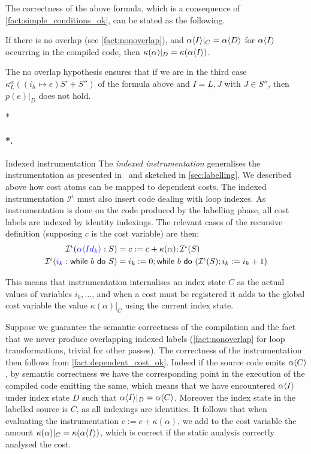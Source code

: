 \documentclass[submission,copyright,creativecommons]{eptcs}
\makeatletter
\theoremstyle{definition}
\newcommand{\s}[1]{{\sf #1}}    \newcommand{\vc}[1]{{\bf #1}}
\newcommand{\sop}[1]{\s{#1}\ }
\newcommand{\sbin}[1]{\ \s{#1}\ }
\newcommand{\ass}{\mathrel{:=}}
\def\lbl#1:{\mbox{\color{blue}$#1$}:}
\let\oldparagraph\paragraph
\def\paragraph{\@ifnextchar*\new@paragraph@star\new@paragraph}
\def\new@paragraph@star*#1{\oldparagraph*{#1.}}
\def\new@paragraph#1{\oldparagraph{#1.}}
\makeatother
\begin{document}
The correctness of the above formula, which is a consequence of \autoref{fact:simple_conditions_ok},
can be stated as the following.
\begin{fact}
\label{fact:dependent_cost_ok}
If there is no overlap (see \autoref{fact:nonoverlap}), and $\alpha\langle I\rangle|_C=\alpha\langle D\rangle$
for $\alpha\langle I\rangle$ occurring in the compiled code, then
$\kappa(\alpha)|_D=\kappa(\alpha\langle I\rangle)$.
\end{fact}
The no overlap hypothesis ensures that if we are in the third case
$\kappa^\alpha_L((i_h\mapsto e)S'+S'')$ of the
formula above and $I=L,J$ with $J\in S''$, then $p(e)|_D$ does not hold.

\paragraph*{Indexed instrumentation}
The \emph{indexed instrumentation} generalises the instrumentation as presented
in~\cite{labeling} and sketched in \autoref{sec:labelling}.
We described above how cost atoms can be mapped to dependent costs.
The indexed instrumentation $\mathcal I^\iota$ must also insert code dealing
with loop indexes.
As instrumentation is done on the code produced by the labelling phase, all cost labels are indexed by identity indexings.
The relevant cases of the recursive definition (supposing $c$ is the cost variable) are then:
$$
\begin{aligned}
\mathcal I^\iota(\lbl{\alpha\la Id_k\ra}:S) &= c\ass c + \kappa(\alpha);\mathcal I^\iota(S)\\
\mathcal I^\iota(\lbl i_k : \sop{while}b\sbin{do}S) &=
  i_k \ass 0; \sop{while}b\sbin{do}(\mathcal I^\iota (S); i_k \ass i_k + 1)
\end{aligned}
$$

This means that instrumentation internalises an index state $C$ as the actual values of
variables $i_0,\ldots$, and when a cost must be registered it adds to the global
cost variable the value $\kappa(\alpha)|_C$ using the current index state.

Suppose we guarantee the semantic correctness of the compilation and the
fact that we never produce overlapping indexed labels (\autoref{fact:nonoverlap}
for loop transformations, trivial for other passes).
The correctness of the instrumentation then follows from \autoref{fact:dependent_cost_ok}.
Indeed if the source code emits $\alpha \langle C\rangle$, by semantic correctness we have
the corresponding point in the execution of the compiled code emitting the same,
which means that we have encountered $\alpha\langle I\rangle$ under index state
$D$ such that $\alpha\langle I\rangle|_D=\alpha\langle C\rangle$. Moreover the index state in
the labelled source is $C$, as all indexings are identities. It follows that
when evaluating the instrumentation $c \ass c + \kappa(\alpha)$, we
add to the cost variable the amount $\kappa(\alpha)|_C=\kappa(\alpha\langle I\rangle)$,
which is correct if the static analysis correctly analysed the cost.
\end{document}
